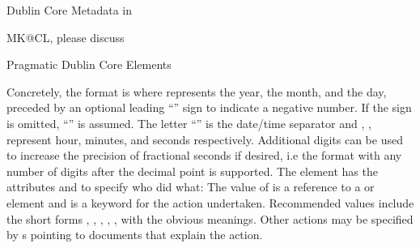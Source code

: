 \begin{module}[id=dc-elements]
\begin{omgroup}[id=dc-elements]{Dublin Core Metadata in \omdoc}
\begin{newpart}{MK@CL, please discuss}
\begin{omgroup}{Pragmatic Dublin Core Elements}
\begin{definition}[id=dc.date.def,title=Dates]
  Concretely, the format is
  {}
  where {} represents the year, {} the month, and {}
  the day, preceded by an optional leading ``{\snippet{-}}'' sign to indicate a negative
  number. If the sign is omitted, ``{\snippet{+}}'' is assumed.  The letter
  ``{}'' is the date/time separator and {}, {},
  {} represent hour, minutes, and seconds respectively.  Additional digits can
  be used to increase the precision of fractional seconds if desired, i.e the format
  {} with any number of digits after the decimal
  point is supported.  The {} element has the attributes
   and  to specify
  who did what: The value of  is a reference to a
   or  element and
   is a keyword for the action
  undertaken. Recommended values include the short forms
  ,
  ,
  ,
  ,
  ,
   with the obvious meanings. Other actions may
  be specified by {s} pointing to documents that explain the action.
\end{definition}


\end{omgroup}
\end{newpart}
\end{omgroup}
\end{module}
